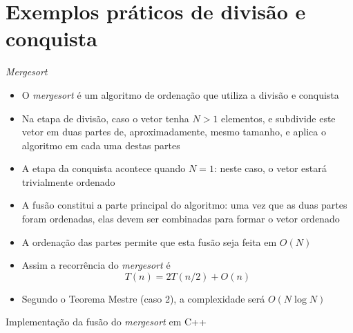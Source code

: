 \section{Exemplos práticos de divisão e conquista}

\begin{frame}[fragile]{\it Mergesort}

    \begin{itemize}
        \item O \textit{mergesort} é um algoritmo de ordenação que utiliza a divisão e conquista

        \item Na etapa de divisão, caso o vetor tenha $N > 1$ elementos, e subdivide este vetor
            em duas partes de, aproximadamente, mesmo tamanho, e aplica o algoritmo em cada
            uma destas partes

        \item A etapa da conquista acontece quando $N = 1$: neste caso, o vetor estará trivialmente
            ordenado

        \item A fusão constitui a parte principal do algoritmo: uma vez que as duas partes foram
            ordenadas, elas devem ser combinadas para formar o vetor ordenado

        \item A ordenação das partes permite que esta fusão seja feita em $O(N)$

        \item Assim a recorrência do \textit{mergesort} é
        \[
            T(n) = 2T(n/2) + O(n)
        \]

        \item Segundo o Teorema Mestre (caso 2), a complexidade será $O(N\log N)$
    \end{itemize}

\end{frame}

\begin{frame}[fragile]{Implementação da fusão do {\it mergesort} em C++}
\end{frame}


